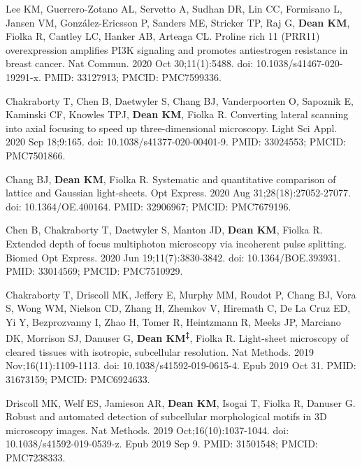 \begin{etaremune}
\item Lee KM, Guerrero-Zotano AL, Servetto A, Sudhan DR, Lin CC, Formisano L, Jansen VM, González-Ericsson P, Sanders ME, Stricker TP, Raj G, \textbf{Dean KM}, Fiolka R, Cantley LC, Hanker AB, Arteaga CL. Proline rich 11 (PRR11) overexpression amplifies PI3K signaling and promotes antiestrogen resistance in breast cancer. Nat Commun. 2020 Oct 30;11(1):5488. doi: 10.1038/s41467-020-19291-x. PMID: 33127913; PMCID: PMC7599336.

\item Chakraborty T, Chen B, Daetwyler S, Chang BJ, Vanderpoorten O, Sapoznik E, Kaminski CF, Knowles TPJ, \textbf{Dean KM}, Fiolka R. Converting lateral scanning into axial focusing to speed up three-dimensional microscopy. Light Sci Appl. 2020 Sep 18;9:165. doi: 10.1038/s41377-020-00401-9. PMID: 33024553; PMCID: PMC7501866.

\item Chang BJ, \textbf{Dean KM}, Fiolka R. Systematic and quantitative comparison of lattice and Gaussian light-sheets. Opt Express. 2020 Aug 31;28(18):27052-27077. doi: 10.1364/OE.400164. PMID: 32906967; PMCID: PMC7679196.

\item Chen B, Chakraborty T, Daetwyler S, Manton JD, \textbf{Dean KM}, Fiolka R. Extended depth of focus multiphoton microscopy via incoherent pulse splitting. Biomed Opt Express. 2020 Jun 19;11(7):3830-3842. doi: 10.1364/BOE.393931. PMID: 33014569; PMCID: PMC7510929.

\item Chakraborty T, Driscoll MK, Jeffery E, Murphy MM, Roudot P, Chang BJ, Vora S, Wong WM, Nielson CD, Zhang H, Zhemkov V, Hiremath C, De La Cruz ED, Yi Y, Bezprozvanny I, Zhao H, Tomer R, Heintzmann R, Meeks JP, Marciano DK, Morrison SJ, Danuser G, \textbf{Dean KM\textsuperscript{‡}}, Fiolka R. Light-sheet microscopy of cleared tissues with isotropic, subcellular resolution. Nat Methods. 2019 Nov;16(11):1109-1113. doi: 10.1038/s41592-019-0615-4. Epub 2019 Oct 31. PMID: 31673159; PMCID: PMC6924633.

\item Driscoll MK, Welf ES, Jamieson AR, \textbf{Dean KM}, Isogai T, Fiolka R, Danuser G. Robust and automated detection of subcellular morphological motifs in 3D microscopy images. Nat Methods. 2019 Oct;16(10):1037-1044. doi: 10.1038/s41592-019-0539-z. Epub 2019 Sep 9. PMID: 31501548; PMCID: PMC7238333.


\end{etaremune}
